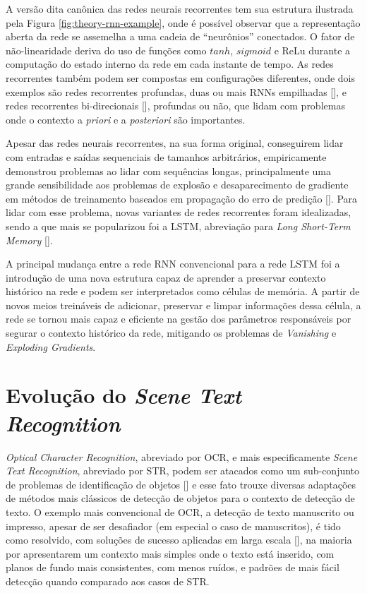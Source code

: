 A versão dita canônica das redes neurais recorrentes tem sua estrutura ilustrada pela Figura \ref{fig:theory-rnn-example}, onde é possível observar que a 
representação aberta da rede se assemelha a uma cadeia de “neurônios” conectados. O fator de não-linearidade deriva do uso de funções como $tanh$, $sigmoid$ 
e ReLu durante a computação do estado interno da rede em cada instante de tempo. As redes recorrentes também podem ser compostas em configurações diferentes, 
onde dois exemplos são redes recorrentes profundas, duas ou mais RNNs empilhadas [], e redes recorrentes bi-direcionais [], 
profundas ou não, que lidam com problemas onde o contexto a \textit{priori} e a \textit{posteriori} são importantes.

Apesar das redes neurais recorrentes, na sua forma original, conseguirem lidar com entradas e saídas sequenciais de tamanhos arbitrários, empiricamente 
demonstrou problemas ao lidar com sequências longas, principalmente uma grande sensibilidade aos problemas de explosão e desaparecimento de gradiente 
em métodos de treinamento baseados em propagação do erro de predição []. Para lidar com esse problema, novas variantes de redes 
recorrentes foram idealizadas, sendo a que mais se popularizou foi a LSTM, abreviação para \textit{Long Short-Term Memory} [].

A principal mudança entre a rede RNN convencional para a rede LSTM foi a introdução de uma nova estrutura capaz de aprender a preservar contexto histórico 
na rede e podem ser interpretados como células de memória. A partir de novos meios treináveis de adicionar, preservar e limpar informações dessa célula, a 
rede se tornou mais capaz e eficiente na gestão dos parâmetros responsáveis por segurar o contexto histórico da rede, mitigando os problemas de 
\textit{Vanishing} e \textit{Exploding Gradients}. 


\section{Evolução do \textit{Scene Text Recognition}}
\textit{Optical Character Recognition}, abreviado por OCR, e mais especificamente \textit{Scene Text Recognition}, abreviado por STR, podem ser atacados como um 
sub-conjunto de problemas de identificação de objetos [] e esse fato trouxe diversas adaptações de métodos mais clássicos 
de detecção de objetos para o contexto de detecção de texto. O exemplo mais convencional de OCR, a detecção de texto manuscrito ou impresso, apesar de ser 
desafiador (em especial o caso de manuscritos), é tido como resolvido, com soluções de sucesso aplicadas em larga escala 
[], na maioria por apresentarem um contexto mais simples onde o texto está inserido, com planos de fundo mais 
consistentes, com menos ruídos, e padrões de mais fácil detecção quando comparado aos casos de STR.

